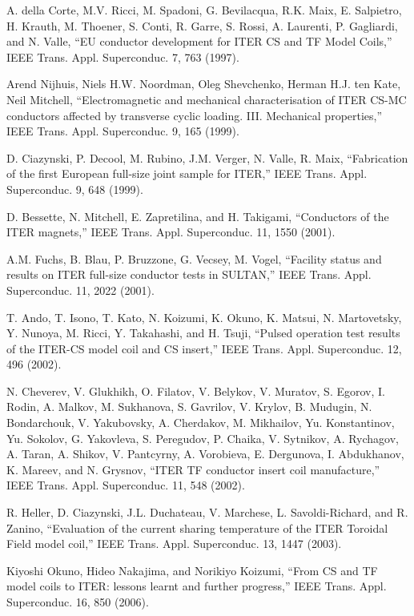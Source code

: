 \noindent [9.45] A. della Corte, M.V. Ricci, M. Spadoni, G. Bevilacqua, R.K. Maix, E. Salpietro,
H. Krauth, M. Thoener, S. Conti, R. Garre, S. Rossi, A. Laurenti, P. Gagliardi,
and N. Valle, ``EU conductor development for ITER CS and TF Model Coils,”
IEEE Trans. Appl. Superconduc. 7, 763 (1997).

\noindent [9.46] Arend Nijhuis, Niels H.W. Noordman, Oleg Shevchenko, Herman H.J. ten Kate,
Neil Mitchell, ``Electromagnetic and mechanical characterisation of ITER CS-MC
conductors affected by transverse cyclic loading. III. Mechanical properties,” IEEE
Trans. Appl. Superconduc. 9, 165 (1999).

\noindent [9.47] D. Ciazynski, P. Decool, M. Rubino, J.M. Verger, N. Valle, R. Maix, ``Fabrication
of the first European full-size joint sample for ITER,” IEEE Trans. Appl. Superconduc.
9, 648 (1999).

\noindent [9.48] D. Bessette, N. Mitchell, E. Zapretilina, and H. Takigami, ``Conductors of the ITER
magnets,” IEEE Trans. Appl. Superconduc. 11, 1550 (2001).

\noindent [9.49] A.M. Fuchs, B. Blau, P. Bruzzone, G. Vecsey, M. Vogel, ``Facility status and results
on ITER full-size conductor tests in SULTAN,” IEEE Trans. Appl. Superconduc.
11, 2022 (2001).

\noindent [9.50] T. Ando, T. Isono, T. Kato, N. Koizumi, K. Okuno, K. Matsui, N. Martovetsky,
Y. Nunoya, M. Ricci, Y. Takahashi, and H. Tsuji, ``Pulsed operation test results
of the ITER-CS model coil and CS insert,” IEEE Trans. Appl. Superconduc. 12,
496 (2002).

\noindent [9.51] N. Cheverev, V. Glukhikh, O. Filatov, V. Belykov, V. Muratov, S. Egorov, I. Rodin,
A. Malkov, M. Sukhanova, S. Gavrilov, V. Krylov, B. Mudugin, N. Bondarchouk,
V. Yakubovsky, A. Cherdakov, M. Mikhailov, Yu. Konstantinov, Yu. Sokolov,
G. Yakovleva, S. Peregudov, P. Chaika, V. Sytnikov, A. Rychagov, A. Taran,
A. Shikov, V. Pantcyrny, A. Vorobieva, E. Dergunova, I. Abdukhanov, K. Mareev,
and N. Grysnov, ``ITER TF conductor insert coil manufacture,” IEEE Trans. Appl.
Superconduc. 11, 548 (2002).

\noindent [9.52] R. Heller, D. Ciazynski, J.L. Duchateau, V. Marchese, L. Savoldi-Richard, and R.
Zanino, ``Evaluation of the current sharing temperature of the ITER Toroidal Field
model coil,” IEEE Trans. Appl. Superconduc. 13, 1447 (2003).

\noindent [9.53] Kiyoshi Okuno, Hideo Nakajima, and Norikiyo Koizumi, ``From CS and TF model
coils to ITER: lessons learnt and further progress,” IEEE Trans. Appl. Superconduc.
16, 850 (2006).

